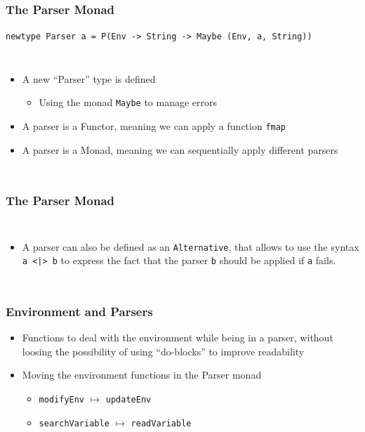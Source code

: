 \documentclass{beamer}
\begin{document}
\begin{frame}
	\frametitle{The Parser Monad}
	\begin{center}
		\lstinline{newtype Parser a = P(Env -> String -> Maybe (Env, a, String))}
	\end{center}
	\begin{columns}
		\footnotesize
		\begin{itemize}
			\item A new ``Parser'' type is defined
				\begin{itemize}
					\footnotesize
					\item Using the monad \lstinline|Maybe| to manage errors
				\end{itemize}
			\item A parser is a Functor, meaning we can apply a function
				\texttt{fmap}
			\item A parser is a Monad, meaning we can sequentially apply
				different parsers
		\end{itemize}
		
		
	\end{columns}
\end{frame}

\begin{frame}
	\frametitle{The Parser Monad}
	\begin{columns}
		\column{0.3\textwidth}
		\footnotesize
		\begin{itemize}
			\item A parser can also be defined as an \texttt{Alternative}, that
				allows to use the syntax \lstinline{a <|> b} to express the
				fact that the parser \texttt{b} should be applied if \texttt{a}
				fails.
		\end{itemize}
		\column{0.65\textwidth}
		
	\end{columns}
\end{frame}

\begin{frame}
	\frametitle{Environment and Parsers}
	\begin{itemize}
		\footnotesize
		\item Functions to deal with the environment while being in a parser,
			without loosing the possibility of using ``do-blocks'' to improve
			readability
		\item Moving the environment functions in the Parser monad
			\begin{itemize}
				\item \lstinline{modifyEnv} $\mapsto$ \lstinline{updateEnv}
				\item \lstinline{searchVariable} $\mapsto$ \lstinline{readVariable}
			\end{itemize}
	\end{itemize}
	
	
\end{frame}
\end{document}
